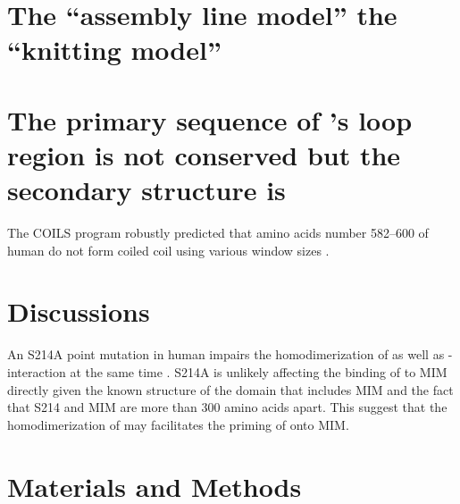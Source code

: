 \section{The ``assembly line model''  the ``knitting model''}

\section{The primary sequence of 's loop region is not conserved but the secondary structure is}
The COILS program robustly predicted that amino acids number 582--600 of human  do not form coiled coil using various window sizes \cite{LupasCOILS}.

\section{Discussions}

An S214A point mutation in human  impairs the homodimerization of  as well as - interaction at the same time \cite{ATMPhosphorylatesMad1S214}. S214A is unlikely affecting the binding of  to  MIM directly given the known structure of the domain that includes MIM \cite{Structure1GO4} and the fact that S214 and MIM are more than 300 amino acids apart. This suggest that the homodimerization of  may facilitates the priming of  onto  MIM.

\section{Materials and Methods}